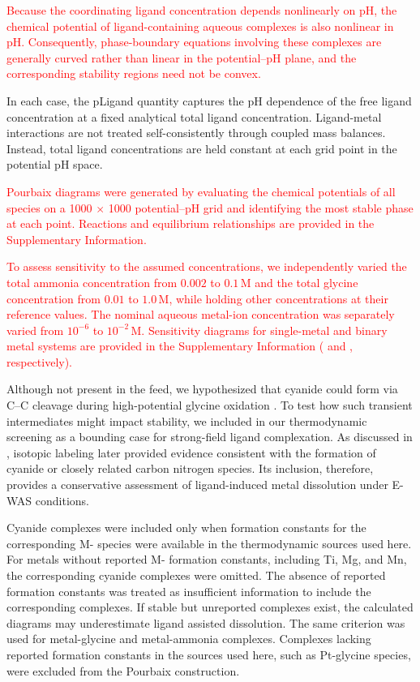 \documentclass[twoside,twocolumn,9pt]{article}
\begin{document}
\textcolor{red}{Because the coordinating ligand concentration depends nonlinearly on pH, the chemical potential of ligand-containing aqueous complexes is also nonlinear in pH. Consequently, phase-boundary equations involving these complexes are generally curved rather than linear in the potential–pH plane, and the corresponding stability regions need not be convex.}

In each case, the pLigand quantity captures the pH dependence of the free ligand concentration at a fixed analytical total ligand concentration. Ligand-metal interactions are not treated self-consistently through coupled mass balances. Instead, total ligand concentrations are held constant at each grid point in the potential pH space.

\textcolor{red}{Pourbaix diagrams were generated by evaluating the chemical potentials of all species on a 1000 $\times$ 1000 potential–pH grid and identifying the most stable phase at each point. Reactions and equilibrium relationships are provided in the Supplementary Information.
}

\textcolor{red}{To assess sensitivity to the assumed concentrations, we independently varied the total ammonia concentration from $0.002$ to $0.1\,\mathrm{M}$ and the total glycine concentration from $0.01$ to $1.0\,\mathrm{M}$, while holding other concentrations at their reference values. The nominal aqueous metal-ion concentration was separately varied from $10^{-6}$ to $10^{-2}\,\mathrm{M}$. Sensitivity diagrams for single-metal and binary metal systems are provided in the Supplementary Information ( and , respectively).}

Although not present in the feed, we hypothesized that cyanide could form via C–C cleavage during high-potential glycine oxidation \cite{Oraby2020GoldPermanganate, Chen2013AdsorptionStudy}. To test how such transient intermediates might impact stability, we included  in our thermodynamic screening as a bounding case for strong-field ligand complexation. As discussed in , isotopic labeling later provided evidence consistent with the formation of cyanide or closely related carbon nitrogen species. Its inclusion, therefore, provides a conservative assessment of ligand-induced metal dissolution under E-WAS conditions.

Cyanide complexes were included only when formation constants for the corresponding M- species were available in the thermodynamic sources used here. For metals without reported M- formation constants, including Ti, Mg, and Mn, the corresponding cyanide complexes were omitted. The absence of reported formation constants was treated as insufficient information to include the corresponding complexes. If stable but unreported complexes exist, the calculated diagrams may underestimate ligand assisted dissolution. The same criterion was used for metal-glycine and metal-ammonia complexes. Complexes lacking reported formation constants in the sources used here, such as Pt-glycine species, were excluded from the Pourbaix construction.
\end{document}
